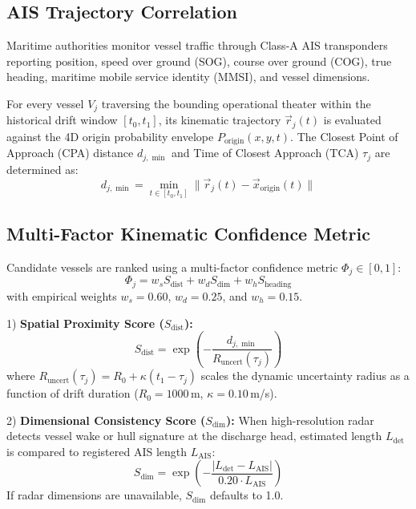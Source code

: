 \documentclass[conference]{IEEEtran}
\begin{document}
\subsection{AIS Trajectory Correlation}
Maritime authorities monitor vessel traffic through Class-A AIS transponders reporting position, speed over ground (SOG), course over ground (COG), true heading, maritime mobile service identity (MMSI), and vessel dimensions.

For every vessel $V_j$ traversing the bounding operational theater within the historical drift window $[t_0, t_1]$, its kinematic trajectory $\vec{r}_j(t)$ is evaluated against the 4D origin probability envelope $P_{\text{origin}}(x, y, t)$. The Closest Point of Approach (CPA) distance $d_{j,\min}$ and Time of Closest Approach (TCA) $\tau_j$ are determined as:
\begin{equation}
d_{j,\min} = \min_{t \in [t_0, t_1]} \|\vec{r}_j(t) - \vec{x}_{\text{origin}}(t)\|
\label{eq:cpa_distance}
\end{equation}

\subsection{Multi-Factor Kinematic Confidence Metric}
Candidate vessels are ranked using a multi-factor confidence metric $\Phi_j \in [0, 1]$:
\begin{equation}
\Phi_j = w_s S_{\text{dist}} + w_d S_{\text{dim}} + w_h S_{\text{heading}}
\label{eq:confidence_metric}
\end{equation}
with empirical weights $w_s = 0.60$, $w_d = 0.25$, and $w_h = 0.15$.

1) \textbf{Spatial Proximity Score ($S_{\text{dist}}$):}
\begin{equation}
S_{\text{dist}} = \exp\left(-\frac{d_{j,\min}}{R_{\text{uncert}}(\tau_j)}\right)
\label{eq:spatial_score}
\end{equation}
where $R_{\text{uncert}}(\tau_j) = R_0 + \kappa (t_1 - \tau_j)$ scales the dynamic uncertainty radius as a function of drift duration ($R_0 = 1000$\,m, $\kappa = 0.10$\,m/s).

2) \textbf{Dimensional Consistency Score ($S_{\text{dim}}$):}
When high-resolution radar detects vessel wake or hull signature at the discharge head, estimated length $L_{\text{det}}$ is compared to registered AIS length $L_{\text{AIS}}$:
\begin{equation}
S_{\text{dim}} = \exp\left(-\frac{|L_{\text{det}} - L_{\text{AIS}}|}{0.20 \cdot L_{\text{AIS}}}\right)
\label{eq:dimension_score}
\end{equation}
If radar dimensions are unavailable, $S_{\text{dim}}$ defaults to 1.0.
\end{document}
